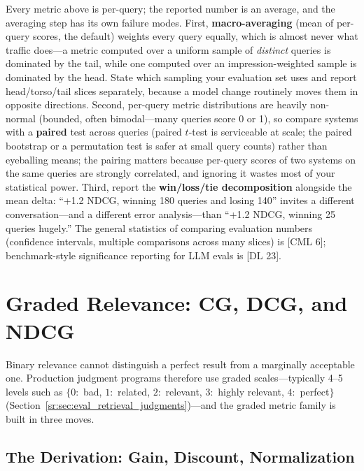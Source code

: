 Every metric above is per-query; the reported number is an average, and the averaging step has its own failure modes. First, \textbf{macro-averaging} (mean of per-query scores, the default) weights every query equally, which is almost never what traffic does---a metric computed over a uniform sample of \textit{distinct} queries is dominated by the tail, while one computed over an impression-weighted sample is dominated by the head. State which sampling your evaluation set uses and report head/torso/tail slices separately, because a model change routinely moves them in opposite directions. Second, per-query metric distributions are heavily non-normal (bounded, often bimodal---many queries score 0 or 1), so compare systems with a \textbf{paired} test across queries (paired $t$-test is serviceable at scale; the paired bootstrap or a permutation test is safer at small query counts) rather than eyeballing means; the pairing matters because per-query scores of two systems on the same queries are strongly correlated, and ignoring it wastes most of your statistical power. Third, report the \textbf{win/loss/tie decomposition} alongside the mean delta: ``+1.2 NDCG, winning 180 queries and losing 140'' invites a different conversation---and a different error analysis---than ``+1.2 NDCG, winning 25 queries hugely.'' The general statistics of comparing evaluation numbers (confidence intervals, multiple comparisons across many slices) is [CML 6]; benchmark-style significance reporting for LLM evals is [DL 23].

\section{Graded Relevance: CG, DCG, and NDCG}
\label{sr:sec:eval_ndcg}

Binary relevance cannot distinguish a perfect result from a marginally acceptable one. Production judgment programs therefore use graded scales---typically 4--5 levels such as $\{0\colon$ bad, $1\colon$ related, $2\colon$ relevant, $3\colon$ highly relevant, $4\colon$ perfect$\}$ (Section~\ref{sr:sec:eval_retrieval_judgments})---and the graded metric family is built in three moves.

\subsection{The Derivation: Gain, Discount, Normalization}

